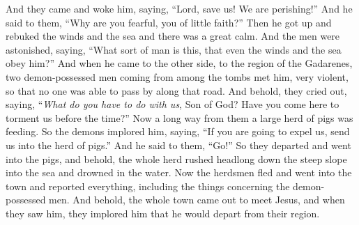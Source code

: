 \begin{biblechapter}
\verse And they came and woke him, saying, “Lord, save us! We are perishing!”
\verse And he said to them, “Why are you fearful, you of little faith?” Then he got up and rebuked the winds and the sea and there was a great calm.
\verse And the men were astonished, saying, “What sort of man is this, that even the winds and the sea obey him?”
 And when he came to the other side, to the region of the Gadarenes, two demon-possessed men coming from among the tombs met him, very violent, so that no one was able to pass by along that road.
\verse And behold, they cried out, saying, “\textit{What do you have to do with us}, Son of God? Have you come here to torment us before the time?”
\verse Now a long way from them a large herd of pigs was feeding.
\verse So the demons implored him, saying, “If you are going to expel us, send us into the herd of pigs.”
\verse And he said to them, “Go!” So they departed and went into the pigs, and behold, the whole herd rushed headlong down the steep slope into the sea and drowned in the water.
\verse Now the herdsmen fled and went into the town and reported everything, including the things concerning the demon-possessed men.
\verse And behold, the whole town came out to meet Jesus, and when they saw him, they implored him that he would depart from their region.
\end{biblechapter}

